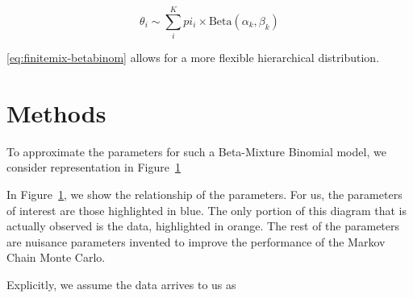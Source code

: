 \documentclass{article}
\begin{document}
\begin{equation}\label{eq:finitemix-betabinom}
\theta_i \sim \sum_i^K pi_i \times \text{Beta}(\alpha_k, \beta_k)
\end{equation}

\eqref{eq:finitemix-betabinom} allows for a more flexible hierarchical distribution. 
\newpage

\section{Methods}

To approximate the parameters for such a Beta-Mixture Binomial model, we consider representation in Figure~\ref{fig:diagram}

\begin{figure}
\centering
{}
\label{fig:diagram}
\end{figure}

In Figure~\ref{fig:diagram}, we show the relationship of the parameters. For us, the parameters of interest are those highlighted in {\color{blue}blue}. The only portion of this diagram that is actually observed is the data, highlighted in {\color{orange}orange}. The rest of the parameters are nuisance parameters invented to improve the performance of the Markov Chain Monte Carlo.

Explicitly, we assume the data arrives to us as
\end{document}

